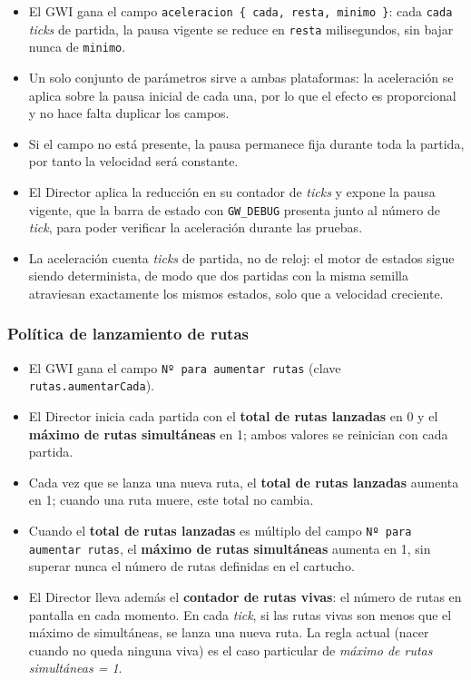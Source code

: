 \begin{itemize}
	\item El GWI gana el campo
	\texttt{aceleracion \{ cada, resta, minimo \}}: cada \texttt{cada}
	\textit{ticks} de partida, la pausa vigente se reduce en \texttt{resta}
	milisegundos, sin bajar nunca de \texttt{minimo}.
	
	\item Un solo conjunto de parámetros sirve a ambas plataformas: la
	aceleración se aplica sobre la pausa inicial de cada una, por lo que el
	efecto es proporcional y no hace falta duplicar los campos.
	
	\item Si el campo no está presente, la pausa permanece fija durante toda
	la partida, por tanto la velocidad será constante.
	
	\item El Director aplica la reducción en su contador de \textit{ticks} y
	expone la pausa vigente, que la barra de estado con \texttt{GW\_DEBUG}
	presenta junto al número de \textit{tick}, para poder verificar la
	aceleración durante las pruebas.
	
	\item La aceleración cuenta \textit{ticks} de partida, no de reloj: el
	motor de estados sigue siendo determinista, de modo que dos partidas con
	la misma semilla atraviesan exactamente los mismos estados, solo que a
	velocidad creciente.
\end{itemize}

\subsubsection{Política de lanzamiento de rutas}

\begin{itemize}
	\item El GWI gana el campo \texttt{Nº para aumentar rutas}
	(clave \texttt{rutas.aumentarCada}).
	
	\item El Director inicia cada partida con el \textbf{total de rutas
		lanzadas} en 0 y el \textbf{máximo de rutas simultáneas} en 1; ambos
	valores se reinician con cada partida.
	
	\item Cada vez que se lanza una nueva ruta, el \textbf{total de rutas
		lanzadas} aumenta en 1; cuando una ruta muere, este total no cambia.
	
	\item Cuando el \textbf{total de rutas lanzadas} es múltiplo del campo
	\texttt{Nº para aumentar rutas}, el \textbf{máximo de rutas
		simultáneas} aumenta en 1, sin superar nunca el número de rutas
	definidas en el cartucho.
	
	\item El Director lleva además el \textbf{contador de rutas vivas}: el
	número de rutas en pantalla en cada momento. En cada \textit{tick}, si
	las rutas vivas son menos que el máximo de simultáneas, se lanza una
	nueva ruta. La regla actual (nacer cuando no queda ninguna viva) es el
	caso particular de \emph{máximo de rutas simultáneas = 1}.
\end{itemize}

